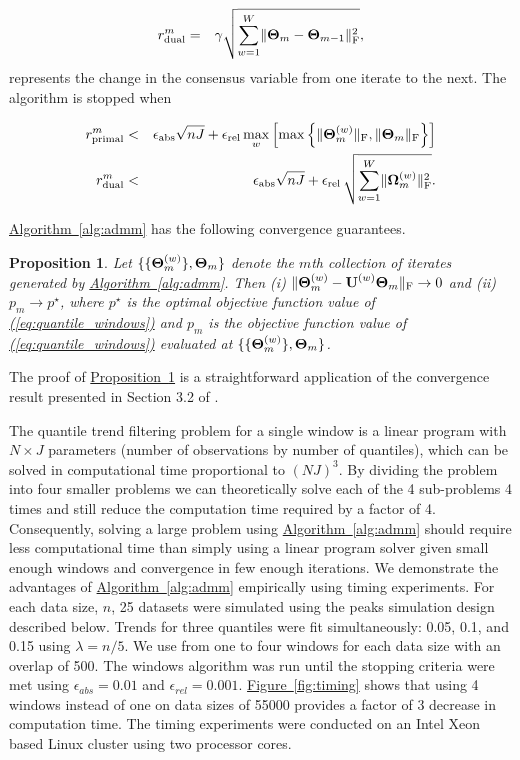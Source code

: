 \documentclass[aoas]{imsart}
\newtheorem{proposition}{Proposition}[section]
\newcommand{\Eqn}[1]{\hyperref[eq:#1]{{\rm (\ref*{eq:#1})}}} %
\newcommand{\Fig}[1]{\hyperref[fig:#1]{Figure~\ref*{fig:#1}}} %
\newcommand{\Prop}[1]{\hyperref[prop:#1]{Proposition~\ref*{prop:#1}}} %
\newcommand{\Alg}[1]{\hyperref[alg:#1]{Algorithm~\ref*{alg:#1}}} %
\newcommand{\Eqn}[1]{{(\ref{eq:#1})}} %
\newcommand{\Fig}[1]{{Figure~\ref{fig:#1}}} %
\newcommand{\Prop}[1]{{Property~\ref{prop:#1}}} %
\newcommand{\Alg}[1]{{Algorithm~\ref{alg:#1}}} %
\newcommand{\M}[1]{{\bm{\mathbf{\MakeUppercase{#1}}}}} %
\newcommand{\Mn}[2]{\M{#1}^{(#2)}} %
\begin{document}
\begin{eqnarray*}
	r_{\text{dual}}^{m} & = & \gamma\sqrt{\sum_{w=1}^W \lVert\M{\Theta}_m - \M{\Theta}_{m-1}\rVert_{\text{F}}^2},
\end{eqnarray*}
represents the change in the consensus variable from one iterate to the next. The algorithm is stopped when

\begin{eqnarray*}
	r_{\text{primal}}^{m} & < &\epsilon_{\text{abs}}\sqrt{nJ} + \epsilon_{\text{rel}}\,\underset{w}{\max} \left[\max
	\left\{\lVert\Mn{\Theta}{w}_m \rVert_{\text{F}}, \lVert \M{\Theta}_{m} \rVert_{\text{F}} \right\}\right] \\%
	r_{\text{dual}}^{m} & < & \epsilon_{\text{abs}}\sqrt{nJ} + \epsilon_{\text{rel}}\,\sqrt{\sum_{w=1}^W
		\lVert \Mn{\Omega}{w}_m \rVert_{\text{F}}^2}.
\end{eqnarray*}

\Alg{admm} has the following convergence guarantees.

\begin{proposition}
	\label{prop:convergence}
	Let $\{\{\Mn{\Theta}{w}_m\}, \M{\Theta}_m\}$ denote the $m$th collection of iterates generated by \Alg{admm}. Then (i)
	$\lVert \Mn{\Theta}{w}_m - \Mn{U}{w}\M{\Theta}_m \rVert_{\text{F}} \rightarrow 0$ and (ii) $p_m \rightarrow p^\star$, where $p^\star$ is the optimal objective function value of
	\Eqn{quantile_windows} and $p_m$ is the objective function value of \Eqn{quantile_windows} evaluated at $\{\{\Mn{\Theta}{w}_m\}, \M{\Theta}_m\}$.
\end{proposition}

The proof of \Prop{convergence} is a straightforward application of the convergence result presented in Section 3.2 of \cite{boyd2011distributed}.

The quantile trend filtering problem for a single window is a linear program with $N\times J$ parameters (number of observations by number of quantiles), which can be solved in computational time proportional to $(NJ)^3$. By dividing the problem into four smaller problems we can theoretically solve each of the 4 sub-problems 4 times and still reduce the computation time required by a factor of 4. Consequently, solving a large problem using \Alg{admm} should require less computational time than simply using a linear program solver given small enough windows and convergence in few enough iterations. We demonstrate the advantages of \Alg{admm} empirically using timing experiments. For each data size, $n$, 25 datasets were simulated using the peaks simulation design described below. Trends for three quantiles were fit simultaneously: 0.05, 0.1, and 0.15 using $\lambda = n/5$. We use from one to four windows for each data size with an overlap of 500. The windows algorithm was run until the stopping criteria were met using $\epsilon_{abs} = 0.01$ and $\epsilon_{rel} = 0.001$. \Fig{timing} shows that using 4 windows instead of one on data sizes of 55000 provides a factor of 3 decrease in computation time. The timing experiments were conducted on an Intel Xeon based Linux cluster using two processor cores.
\end{document}
